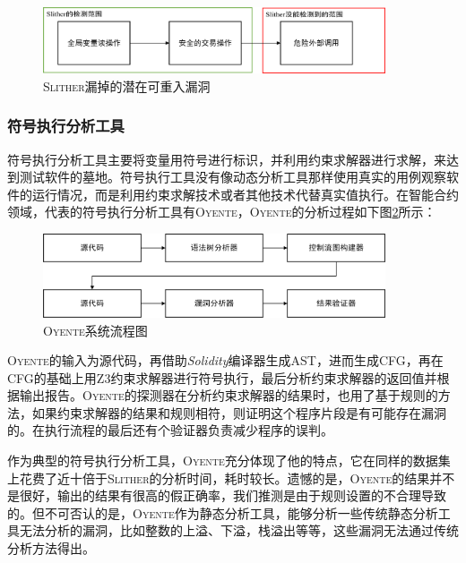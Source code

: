 \begin{figure}
\vspace{+2mm}
  \centering
  \includegraphics[width=0.9\textwidth]{figures/variant_reentrancy_pattern.png}
  \caption{\textsc{Slither}漏掉的潜在可重入漏洞}
  \label{fig:reentrancy_variant}
\vspace{-5mm}
\end{figure}



\subsubsection{符号执行分析工具}

符号执行分析工具主要将变量用符号进行标识，并利用约束求解器进行求解，来达到测试软件的墓地。符号执行工具没有像动态分析工具那样使用真实的用例观察软件的运行情况，而是利用约束求解技术或者其他技术代替真实值执行。在智能合约领域，代表的符号执行分析工具有\textsc{Oyente}，\textsc{Oyente}的分析过程如下图\ref{fig:oyente_process}所示：

\begin{figure}
\vspace{+2mm}
  \centering
  \includegraphics[width=0.9\textwidth]{figures/oyente_process.png}
  \caption{\textsc{Oyente}系统流程图}
  \label{fig:oyente_process}
\vspace{-5mm}
\end{figure}

\textsc{Oyente}的输入为源代码，再借助\emph{Solidity}编译器生成AST，进而生成CFG，再在CFG的基础上用Z3约束求解器进行符号执行，最后分析约束求解器的返回值并根据输出报告。\textsc{Oyente}的探测器在分析约束求解器的结果时，也用了基于规则的方法，如果约束求解器的结果和规则相符，则证明这个程序片段是有可能存在漏洞的。在执行流程的最后还有个验证器负责减少程序的误判。

作为典型的符号执行分析工具，\textsc{Oyente}充分体现了他的特点，它在同样的数据集上花费了近十倍于\textsc{Slither}的分析时间，耗时较长。遗憾的是，\textsc{Oyente}的结果并不是很好，输出的结果有很高的假正确率，我们推测是由于规则设置的不合理导致的。但不可否认的是，\textsc{Oyente}作为静态分析工具，能够分析一些传统静态分析工具无法分析的漏洞，比如整数的上溢、下溢，栈溢出等等，这些漏洞无法通过传统分析方法得出。

